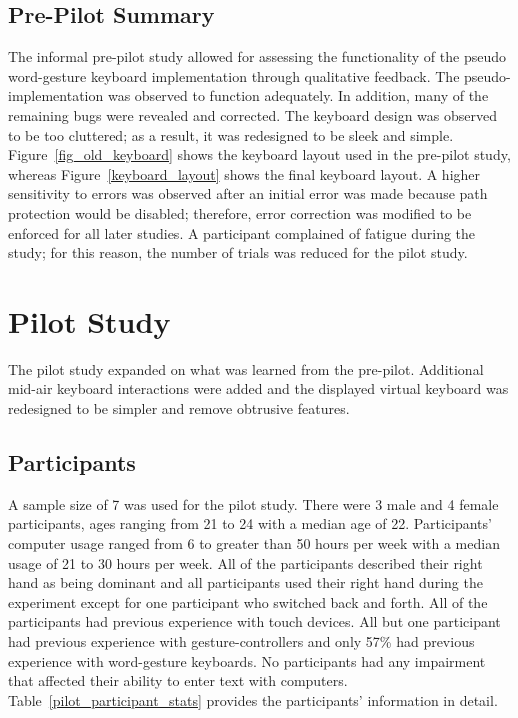 \subsection{Pre-Pilot Summary}
The informal pre-pilot study allowed for assessing the functionality of the pseudo word-gesture keyboard implementation through qualitative feedback. The pseudo-implementation was observed to function adequately. In addition, many of the remaining bugs were revealed and corrected. The keyboard design was observed to be too cluttered; as a result, it was redesigned to be sleek and simple. Figure~\ref{fig_old_keyboard} shows the keyboard layout used in the pre-pilot study, whereas Figure~\ref{keyboard_layout} shows the final keyboard layout. A higher sensitivity to errors was observed after an initial error was made because path protection would be disabled; therefore, error correction was modified to be enforced for all later studies. A participant complained of fatigue during the study; for this reason, the number of trials was reduced for the pilot study.

\section{Pilot Study} \label{pilot}
The pilot study expanded on what was learned from the pre-pilot. Additional mid-air keyboard interactions were added and the displayed virtual keyboard was redesigned to be simpler and remove obtrusive features.

\subsection{Participants} \label{pilot_participants}
A sample size of 7 was used for the pilot study. There were 3 male and 4 female participants, ages ranging from 21 to 24 with a median age of 22. Participants' computer usage ranged from 6 to greater than 50 hours per week with a median usage of 21 to 30 hours per week. All of the participants described their right hand as being dominant and all participants used their right hand during the experiment except for one participant who switched back and forth. All of the participants had previous experience with touch devices. All but one participant had previous experience with gesture-controllers and only 57\% had previous experience with word-gesture keyboards. No participants had any impairment that affected their ability to enter text with computers. Table~\ref{pilot_participant_stats} provides the participants' information in detail.


